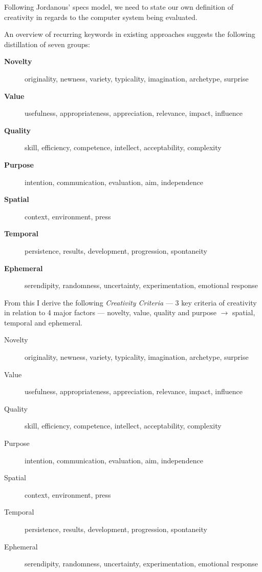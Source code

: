 Following Jordanous' \gls{specs} model, we need to state our own definition of creativity in regards to the computer system being evaluated.

An overview of recurring keywords in existing approaches suggests the following distillation of seven groups:

\begin{description}
  \item [\textbf{Novelty}] originality, newness, variety, typicality, imagination, archetype, surprise
  \item [\textbf{Value}] usefulness, appropriateness, appreciation, relevance, impact, influence
  \item [\textbf{Quality}] skill, efficiency, competence, intellect, acceptability, complexity
  \item [\textbf{Purpose}] intention, communication, evaluation, aim, independence
  \item [\textbf{Spatial}] context, environment, press
  \item [\textbf{Temporal}] persistence, results, development, progression, spontaneity
  \item [\textbf{Ephemeral}] serendipity, randomness, uncertainty, experimentation, emotional response
\end{description}


From this I derive the following \hypertarget{creadef}{\textit{Creativity Criteria}} --- 3 key criteria of creativity in relation to 4 major factors --- novelty, value, quality and purpose $\to$ spatial, temporal and ephemeral.

\begin{description}
  \item [Novelty] originality, newness, variety, typicality, imagination, archetype, surprise
  \item [Value] usefulness, appropriateness, appreciation, relevance, impact, influence
  \item [Quality] skill, efficiency, competence, intellect, acceptability, complexity
  \item [Purpose] intention, communication, evaluation, aim, independence
  \item [Spatial] context, environment, press
  \item [Temporal] persistence, results, development, progression, spontaneity
  \item [Ephemeral] serendipity, randomness, uncertainty, experimentation, emotional response
\end{description}


